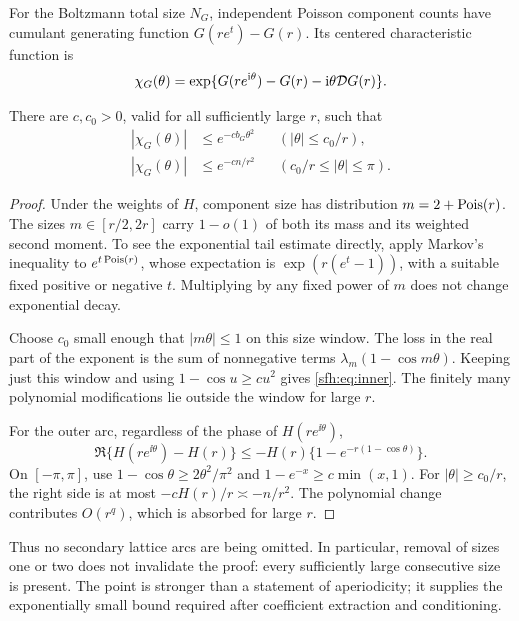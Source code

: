 For the Boltzmann total size $N_G$, independent Poisson component counts have cumulant generating function $G(re^t)-G(r)$. Its centered characteristic function is
\[
 \chi_G(\theta)=\exp\{G(re^{\mathrm i\theta})-G(r)-\mathrm i\theta\mathcal D G(r)\}.
\]
\begin{lemma}\label{sfh:lem:arcs}
There are $c,c_0>0$, valid for all sufficiently large $r$, such that
\begin{align}
 |\chi_G(\theta)|&\le e^{-cb_G\theta^2}
       &&(|\theta|\le c_0/r),\label{sfh:eq:inner}\\
 |\chi_G(\theta)|&\le e^{-cn/r^2}
       &&(c_0/r\le|\theta|\le\pi).\label{sfh:eq:outer}
\end{align}
\end{lemma}
\begin{proof}
Under the weights of $H$, component size has distribution $m=2+\operatorname{Pois}(r)$. The sizes $m\in[r/2,2r]$ carry $1-o(1)$ of both its mass and its weighted second moment. To see the exponential tail estimate directly, apply Markov's inequality to $e^{t\operatorname{Pois}(r)}$, whose expectation is $\exp(r(e^t-1))$, with a suitable fixed positive or negative $t$. Multiplying by any fixed power of $m$ does not change exponential decay.

Choose $c_0$ small enough that $|m\theta|\le1$ on this size window. The loss in the real part of the exponent is the sum of nonnegative terms $\lambda_m(1-\cos m\theta)$. Keeping just this window and using $1-\cos u\ge c u^2$ gives \eqref{sfh:eq:inner}. The finitely many polynomial modifications lie outside the window for large $r$.

For the outer arc, regardless of the phase of $H(re^{\ii\theta})$,
\begin{equation}\label{sfh:eq:radial}
 \Re\{H(re^{\ii\theta})-H(r)\}
 \le-H(r)\{1-e^{-r(1-\cos\theta)}\}.
\end{equation}
On $[-\pi,\pi]$, use $1-\cos\theta\ge2\theta^2/\pi^2$ and
$1-e^{-x}\ge c\min(x,1)$. For $|\theta|\ge c_0/r$, the right side is at most $-cH(r)/r\asymp-n/r^2$. The polynomial change contributes $O(r^q)$, which is absorbed for large $r$.
\end{proof}

Thus no secondary lattice arcs are being omitted. In particular, removal of sizes one or two does not invalidate the proof: every sufficiently large consecutive size is present. The point is stronger than a statement of aperiodicity; it supplies the exponentially small bound required after coefficient extraction and conditioning.
